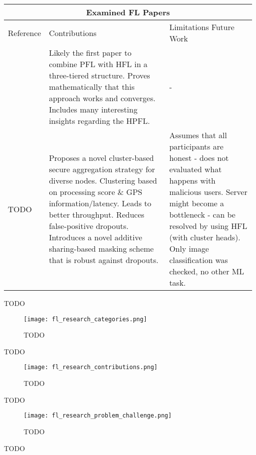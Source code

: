 \vspace{5mm}
\begin{tabular}{ |p{}||p{}|p{}|  }
    \hline
    \multicolumn{3}{|c|}{Examined FL Papers} \\
    \hline
    \hline
    Reference& Contributions& Limitations Future Work\\
    \hline
        \cite{HPFL_over_massive_mobile_edge_computing_networks}
        & 
        Likely the first paper to combine PFL with HFL in a three-tiered structure.
        Proves mathematically that this approach works and converges.
        Includes many interesting insights regarding the HPFL.
        &
        -
    \\
    \hline
        TODO&
        Proposes a novel cluster-based secure aggregation strategy for diverse nodes.
        Clustering based on processing score \& GPS information/latency.
        Leads to better throughput.
        Reduces false-positive dropouts.
        Introduces a novel additive sharing-based masking scheme that is robust against dropouts.
        &
        Assumes that all participants are honest - does not evaluated what happens with malicious users.
        Server might become a bottleneck - can be resolved by using HFL (with cluster heads).
        Only image classification was checked, no other ML task.
    \\
    \hline
\end{tabular}

TODO

\begin{figure}[h]
    \centering
    \texttt{[image: fl\_research\_categories.png]}
    \caption{TODO}
    \label{fig:fl_research_categories}
\end{figure}

TODO

\begin{figure}[h]
    \centering
    \texttt{[image: fl\_research\_contributions.png]}
    \caption{TODO}
    \label{fig:fl_research_contributions}
\end{figure}

TODO

\begin{figure}[h]
    \centering
    \texttt{[image: fl\_research\_problem\_challenge.png]}
    \caption{TODO}
    \label{fig:fl_research_problem_challenge}
\end{figure}

TODO

